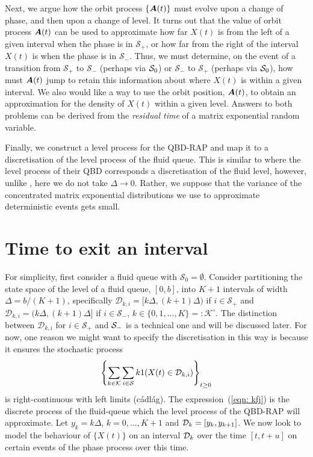 Next, we argue how the orbit process \(\{\boldsymbol A(t)\}\) must evolve upon a change of phase, and then upon a change of level. It turns out that the value of orbit process \(\boldsymbol A(t)\) can be used to approximate how far \(X(t)\) is from the left of a given interval when the phase is in \(\mathcal S_+\), or how far from the right of the interval \(X(t)\) is when the phase is in \(\mathcal S_-\). Thus, we must determine, on the event of a transition from \(\mathcal S_+\) to \(\mathcal S_-\) (perhaps via \(\mathcal{S}_0\)) or \(\mathcal S_-\) to \(\mathcal S_+\) (perhaps via \(\mathcal{S}_0\)), how must \(\boldsymbol A(t)\) jump to retain this information about where \(X(t)\) is within a given interval. We also would like a way to use the orbit position, \(\boldsymbol A(t)\), to obtain an approximation for the density of \(X(t)\) within a given level. Answers to both problems can be derived from the \emph{residual time} of a matrix exponential random variable. %

Finally, we construct a level process for the QBD-RAP and map it to a discretisation of the level process of the fluid queue. This is similar to \cite{bo2013} where the level process of their QBD corresponds a discretisation of the fluid level, however, unlike \cite{bo2013}, here we do not take \(\Delta \to 0\). Rather, we suppose that the variance of the concentrated matrix exponential distributions we use to approximate deterministic events gets small. %

\section{Time to exit an interval}\label{sec: modelling}
For simplicity, first consider a fluid queue with \(\mathcal S_0=\emptyset\). Consider partitioning the state space of the level of a fluid queue, \([0,b]\), into \(K+1\) intervals of width \(\Delta = b/(K+1)\), specifically \(\mathcal D_{k,i} = [k\Delta,(k+1)\Delta)\) if \(i\in\mathcal S_+\) and \(\mathcal D_{k,i} = (k\Delta,(k+1)\Delta]\) if \(i\in\mathcal S_-\), \(k\in\{0,1,...,K\}=:\mathcal K^\circ\). The distinction between \(\mathcal D_{k,i}\) for \(i\in\mathcal S_+\) and \(\mathcal{S}_-\) is a technical one and will be discussed later. For now, one reason we might want to specify the discretisation in this way is because it ensures the stochastic process 
\begin{align}
	\displaystyle \left\{\sum_{k\in\mathcal K}\sum_{i\in\mathcal{S}} k1(X(t)\in\mathcal{D}_{k,i})\right\}_{t\geq 0} \label{eqn: kfj}
\end{align}
is right-continuous with left limits (c\'adl\'ag). The expression~(\ref{eqn: kfj}) is the discrete process of the fluid-queue which the level process of the QBD-RAP will approximate. Let \(y_k = k\Delta\), \(k=0,\dots,K+1\) and \(\mathcal{D}_k = [y_k,y_{k+1}]\). We now look to model the behaviour of \(\{X(t)\}\) on an interval \(\mathcal{D}_k\) over the time \([t,t+u]\) on certain events of the phase process over this time. 

